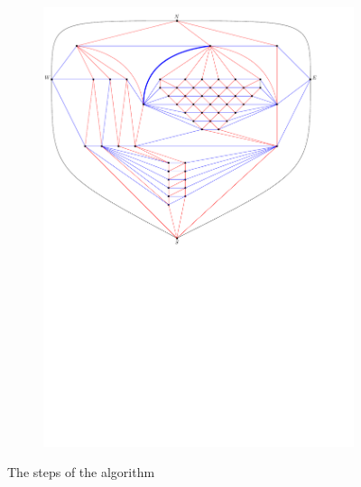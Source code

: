 \begin{figure}
    \ContinuedFloat
    \begin{subfigure}[b]{.9 \textwidth}
      \includegraphics[width=\textwidth]{examples/img/vertWorstCase/subdivfinal}
      \caption{}
      \label{fig:ex:vert:subdivfinal}
    \end{subfigure}
  \caption{The steps of the algorithm}
  \label{}
\end{figure}
